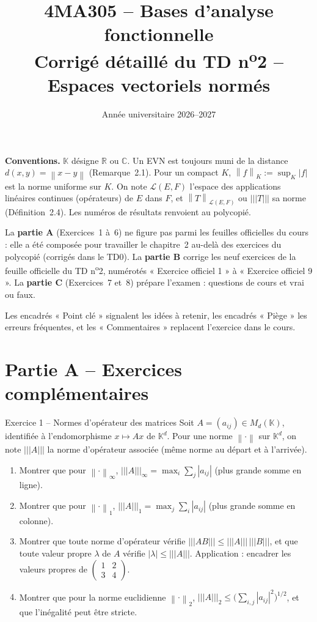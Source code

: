 \documentclass[11pt,a4paper]{article}
\title{\textbf{4MA305 -- Bases d'analyse fonctionnelle}\\[2mm]
\Large Corrigé détaillé du TD n\textsuperscript{o}2 -- Espaces vectoriels normés}
\author{}
\date{Année universitaire 2026--2027}
\newcommand{\R}{\mathbb{R}}
\newcommand{\C}{\mathbb{C}}
\newcommand{\K}{\mathbb{K}}
\newcommand{\norm}[1]{\left\|#1\right\|}
\newcommand{\opnorm}[1]{|\!|\!|#1|\!|\!|}
\newcommand{\Lc}{\mathcal{L}}
\theoremstyle{definition}
\begin{document}
\maketitle

\begin{commentaire}
\textbf{Conventions.} $\K$ désigne $\R$ ou $\C$. Un EVN est toujours muni de la distance $d(x,y)=\norm{x-y}$ (Remarque~2.1). Pour un compact $K$, $\norm{f}_K:=\sup_K|f|$ est la norme uniforme sur $K$. On note $\Lc(E,F)$ l'espace des applications linéaires continues (opérateurs) de $E$ dans $F$, et $\norm{T}_{\Lc(E,F)}$ ou $\opnorm{T}$ sa norme (Définition~2.4). Les numéros de résultats renvoient au polycopié.

La \textbf{partie A} (Exercices~1 à~6) ne figure pas parmi les feuilles officielles du cours : elle a été composée pour travailler le chapitre~2 au-delà des exercices du polycopié (corrigés dans le TD0). La \textbf{partie B} corrige les neuf exercices de la feuille officielle du TD n\textsuperscript{o}2, numérotés « Exercice officiel 1 » à « Exercice officiel 9 ». La \textbf{partie C} (Exercices~7 et~8) prépare l'examen : questions de cours et vrai ou faux.

Les encadrés « Point clé » signalent les idées à retenir, les encadrés « Piège » les erreurs fréquentes, et les « Commentaires » replacent l'exercice dans le cours.
\end{commentaire}

\section*{Partie A -- Exercices complémentaires}

\begin{exo}{Exercice 1 -- Normes d'opérateur des matrices}
Soit $A=(a_{ij})\in M_d(\K)$, identifiée à l'endomorphisme $x\mapsto Ax$ de $\K^d$. Pour une norme $\norm\cdot$ sur $\K^d$, on note $\opnorm A$ la norme d'opérateur associée (même norme au départ et à l'arrivée).
\begin{enumerate}[label=(\alph*)]
  \item Montrer que pour $\norm\cdot_\infty$, $\opnorm A_\infty=\max_i\sum_j|a_{ij}|$ (plus grande somme en ligne).
  \item Montrer que pour $\norm\cdot_1$, $\opnorm A_1=\max_j\sum_i|a_{ij}|$ (plus grande somme en colonne).
  \item Montrer que toute norme d'opérateur vérifie $\opnorm{AB}\le\opnorm A\,\opnorm B$, et que toute valeur propre $\lambda$ de $A$ vérifie $|\lambda|\le\opnorm A$. Application : encadrer les valeurs propres de $\begin{pmatrix}1&2\\3&4\end{pmatrix}$.
  \item Montrer que pour la norme euclidienne $\norm\cdot_2$, $\opnorm A_2\le\big(\sum_{i,j}|a_{ij}|^2\big)^{1/2}$, et que l'inégalité peut être stricte.
\end{enumerate}
\end{exo}
\end{document}
